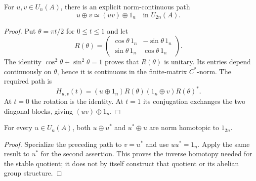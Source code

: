 \begin{proposition}\label{prop:unitary-block-rotation}
For $u,v\in U_n(A)$, there is an explicit norm-continuous path
\[
 u\oplus v\simeq (uv)\oplus 1_n\quad\text{in }U_{2n}(A).
\]
\end{proposition}
\begin{proof}
\leanok
Put $\theta=\pi t/2$ for $0\leq t\leq1$ and let
\[
 R(\theta)=\begin{pmatrix}
 \cos\theta\,1_n&-\sin\theta\,1_n\\
 \sin\theta\,1_n&\cos\theta\,1_n
 \end{pmatrix}.
\]
The identity $\cos^2\theta+\sin^2\theta=1$ proves that $R(\theta)$ is
unitary. Its entries depend continuously on $\theta$, hence it is continuous
in the finite-matrix $C^*$-norm. The required path is
\[
 H_{u,v}(t)=(u\oplus1_n)R(\theta)(1_n\oplus v)R(\theta)^*.
\]
At $t=0$ the rotation is the identity. At $t=1$ its conjugation exchanges
the two diagonal blocks, giving $(uv)\oplus1_n$.
\end{proof}

\begin{proposition}\label{prop:unitary-stable-inverse}
For every $u\in U_n(A)$, both $u\oplus u^*$ and $u^*\oplus u$ are
norm homotopic to $1_{2n}$.
\end{proposition}
\begin{proof}
\leanok
Specialize the preceding path to $v=u^*$ and use $uu^*=1_n$.
Apply the same result to $u^*$ for the second assertion.
This proves the inverse homotopy needed for the stable quotient; it does
not by itself construct that quotient or its abelian group structure.
\end{proof}

